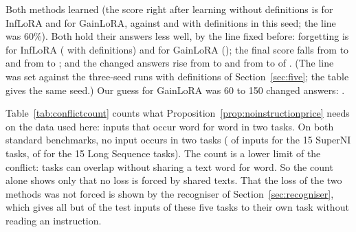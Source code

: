 Both methods learned (the score right after learning without definitions is \AudPubInfloraNoDefLearned{} for InfLoRA and \AudPubGainloraNoDefLearned{} for GainLoRA, against \AudPubInfloraDefLearned{} and \AudPubGainloraDefLearned{} with definitions in this seed; the line was 60\%).
Both hold their answers less well, by the line fixed before: forgetting is \AudPubInfloraNoDefFT{} for InfLoRA (\AudPubInfloraDefFT{} with definitions) and \AudPubGainloraNoDefFT{} for GainLoRA (\AudPubGainloraDefFT{}); the final score falls from \AudPubInfloraDefAP{} to \AudPubInfloraNoDefAP{} and from \AudPubGainloraDefAP{} to \AudPubGainloraNoDefAP{}; and the changed answers rise from \AudPubInfloraDefChanged{} to \AudPubInfloraNoDefChanged{} and from \AudPubGainloraDefChanged{} to \AudPubGainloraNoDefChanged{} of \AudPubCompared{}.
(The line was set against the three-seed runs with definitions of Section~\ref{sec:five}; the table gives the same seed.)
Our guess for GainLoRA was 60 to 150 changed answers: \AudPubGainloraNoDefChanged{}.

Table~\ref{tab:conflictcount} counts what Proposition~\ref{prop:noinstructionprice} needs on the data used here: inputs that occur word for word in two tasks.
On both standard benchmarks, no input occurs in two tasks (\AudConfOneShared{} of \AudConfOneInputs{} inputs for the 15 SuperNI tasks, \AudConfTwoShared{} of \AudConfTwoInputs{} for the 15 Long Sequence tasks).
The count is a lower limit of the conflict: tasks can overlap without sharing a text word for word.
So the count alone shows only that no loss is forced by shared texts. That the loss of the two methods was not forced is shown by the recogniser of Section~\ref{sec:recogniser}, which gives all but \AudRouteFiveRidgeNotOwn{} of the \AudRouteFiveRidgeN{} test inputs of these five tasks to their own task without reading an instruction.

\begin{table}[t]
  \caption{Inputs that occur word for word in the data of two or more tasks. Rows are collections of tasks (training and test inputs of the benchmark tasks; the instances read from the task files for the fresh batches of the paragraph on fresh tasks in Section~\ref{sec:recogniser}). ``Also elsewhere'': inputs that occur in another task of the same collection; \%: their share of all inputs of the collection. A count, not a test.}
  \label{tab:conflictcount}
  \centering
  
\end{table}

